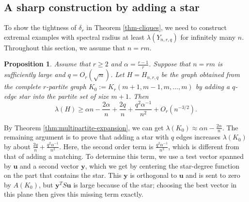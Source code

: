 \documentclass[11pt,a4paper]{article}
\newtheorem{proposition}[theorem]{Proposition}
\theoremstyle{definition}
\theoremstyle{plain}
\renewcommand{\ge}{\geqslant}
\begin{document}
\subsection{A sharp construction by adding a star}

To show the tightness of $\delta_r$ in Theorem \ref{thm-cliques}, we need to construct extremal examples with spectral radius at least $\lambda (Y_{n,r,q})$ for infinitely many $n$. 
Throughout this section, we assume that $ n=r m$. 

\begin{proposition} 
\label{prop:construction} 
    Assume that $r\ge 2$ and $\alpha = \frac{r-1}{r}$. 
    Suppose that $n=rm$ is sufficiently large  and $q=O_r(\sqrt{n})$. 
    Let $H=H_{n,r,q}$ be the graph obtained from the complete $r$-partite graph $ K_0:=K_r(m+1,m-1,m,\ldots,m)$ by adding a $q$-edge star into the partite set of size $m+1$. Then 
    \[   \lambda(H)
        \ge \alpha n-\frac{2\alpha}{n}+\frac{2q}{n}
              +\frac{q^2\alpha^{-1}}{n^2}+O_r(n^{-3/2}).  \]
\end{proposition}


By Theorem \ref{thm:multipartite-expansion}, we can get $\lambda (K_0) \approx \alpha n - \frac{2\alpha}{n}$. 
The remaining argument is to prove that adding a star with $q$ edges increases $\lambda (K_0)$ by about  $ \frac{2q}{n}  + \frac{q^2\alpha^{-1}}{n^2}$. 
Here, the second order term is  $\frac{q^2\alpha^{-1}}{n^2}$, 
which is different from that of adding a matching. 
To determine this term, we use a test
vector spanned by $\bm u$ and a second vector $\bm y$, which we get by centering
the star-degree function on the part that contains the star. This $\bm y$ is orthogonal to
$\bm u$ and is sent to zero by $A(K_0)$, but $\bm y^{T}S\bm u$ is large because of the star;
choosing the best vector in this plane then gives this missing term exactly.
\end{document}
